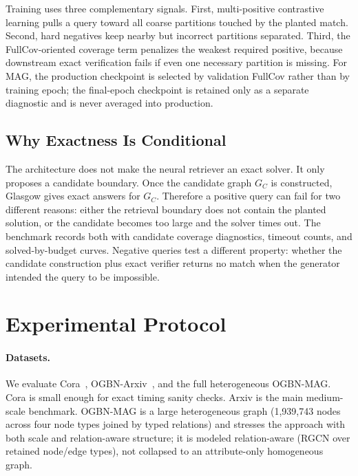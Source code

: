 \documentclass[runningheads]{llncs}
\begin{document}
Training uses three complementary signals. First, multi-positive contrastive learning pulls a query toward all coarse partitions touched by the planted match. Second, hard negatives keep nearby but incorrect partitions separated. Third, the FullCov-oriented coverage term penalizes the weakest required positive, because downstream exact verification fails if even one necessary partition is missing. For MAG, the production checkpoint is selected by validation FullCov rather than by training epoch; the final-epoch checkpoint is retained only as a separate diagnostic and is never averaged into production.

\subsection{Why Exactness Is Conditional}

The architecture does not make the neural retriever an exact solver. It only proposes a candidate boundary. Once the candidate graph $G_C$ is constructed, Glasgow gives exact answers for $G_C$. Therefore a positive query can fail for two different reasons: either the retrieval boundary does not contain the planted solution, or the candidate becomes too large and the solver times out. The benchmark records both with candidate coverage diagnostics, timeout counts, and solved-by-budget curves. Negative queries test a different property: whether the candidate construction plus exact verifier returns no match when the generator intended the query to be impossible.

\section{Experimental Protocol}

\paragraph{Datasets.}
We evaluate Cora~\cite{ref_cora}, OGBN-Arxiv~\cite{ref_ogb}, and the full heterogeneous OGBN-MAG. Cora is small enough for exact timing sanity checks. Arxiv is the main medium-scale benchmark. OGBN-MAG is a large heterogeneous graph (1{,}939{,}743 nodes across four node types joined by typed relations) and stresses the approach with both scale and relation-aware structure; it is modeled relation-aware (RGCN over retained node/edge types), not collapsed to an attribute-only homogeneous graph.
\end{document}
